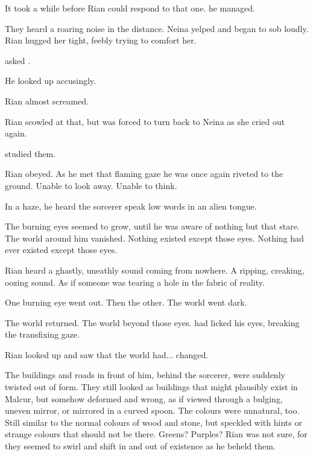 It took a while before Rian could respond to that one.  he managed. 


They heard a roaring noise in the distance. 
Neina yelped and began to sob loudly. 
Rian hugged her tight, feebly trying to comfort her. 

 asked \Ishnaruchaefir. 

He looked up accusingly. 


 Rian almost screamed. 


Rian scowled at that, but was forced to turn back to Neina as she cried out again. 

\Ishnaruchaefir{} studied them. 

Rian obeyed. 
As he met that flaming gaze he was once again riveted to the ground. 
Unable to look away. 
Unable to think. 

In a haze, he heard the sorcerer speak low words in an alien tongue. 

The burning eyes seemed to grow, until he was aware of nothing but that stare. 
The world around him vanished. 
Nothing existed except those eyes. 
Nothing had ever existed except those eyes. 

Rian heard a ghastly, uneathly sound coming from nowhere. 
A ripping, creaking, oozing sound. 
As if someone was tearing a hole in the fabric of reality. 

One burning eye went out. 
Then the other. 
The world went dark. 

The world returned. 
The world beyond those eyes. 
\Ishnaruchaefir{} had licked his eyes, breaking the transfixing gaze. 

Rian looked up and saw that the world had... changed. 

The buildings and roads in front of him, behind the sorcerer, were suddenly twisted out of form. 
They still looked as buildings that might plausibly exist in Malcur, but somehow deformed and wrong, as if viewed through a bulging, uneven mirror, or mirrored in a curved spoon. 
The colours were unnatural, too. 
Still similar to the normal colours of wood and stone, but speckled with hints or strange colours that should not be there. 
Greens? 
Purples?
Rian was not sure, for they seemed to swirl and shift in and out of existence as he beheld them. 

